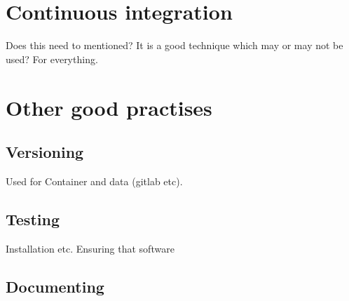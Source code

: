 \section{Continuous integration}
Does this need to mentioned? It is a good technique which may or may not be used? For everything.

\section{Other good practises}

\subsection{Versioning}
Used for Container and data (gitlab etc). 


\subsection{Testing}
Installation etc. Ensuring that software 

\subsection{Documenting}
